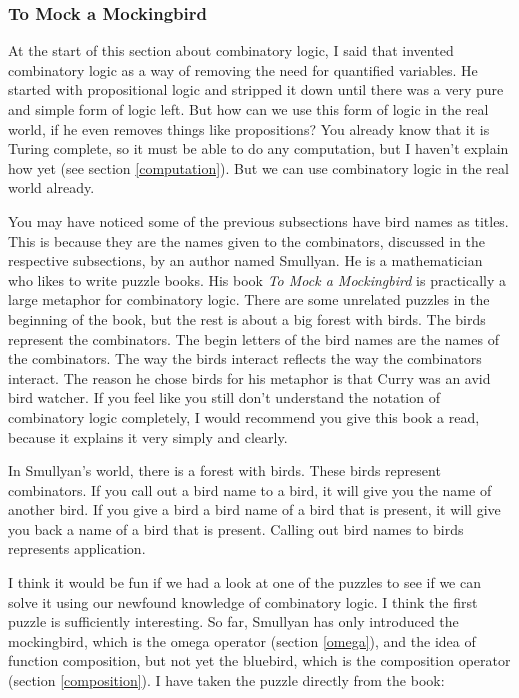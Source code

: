 \documentclass[11pt]{article}
\begin{document}
\subsubsection{To Mock a Mockingbird}

At the start of this section about combinatory logic, I said that
\textcite{schonfinkel1924} invented combinatory logic as a way of removing the
need for quantified variables. He started with propositional logic and stripped
it down until there was a very pure and simple form of logic left. But how can
we use this form of logic in the real world, if he even removes things like
propositions? You already know that it is Turing complete, so it must be able
to do any computation, but I haven't explain how yet (see section
\ref{computation}). But we can use combinatory logic in the real world already.

You may have noticed some of the previous subsections have bird names as
titles. This is because they are the names given to the combinators, discussed
in the respective subsections, by an author named Smullyan. He is a
mathematician who likes to write puzzle books. His book \emph{To Mock a
Mockingbird} \parencite{smullyan2000} is practically a large metaphor for
combinatory logic. There are some unrelated puzzles in the beginning of the
book, but the rest is about a big forest with birds. The birds represent the
combinators. The begin letters of the bird names are the names of the
combinators. The way the birds interact reflects the way the combinators
interact. The reason he chose birds for his metaphor is that Curry was an avid
bird watcher. If you feel like you still don't understand the notation of
combinatory logic completely, I would recommend you give this book a read,
because it explains it very simply and clearly.

In Smullyan's world, there is a forest with birds. These birds represent
combinators. If you call out a bird name to a bird, it will give you the name
of another bird. If you give a bird a bird name of a bird that is present, it
will give you back a name of a bird that is present. Calling out bird names to
birds represents application.

I think it would be fun if we had a look at one of the puzzles to see if we can
solve it using our newfound knowledge of combinatory logic. I think the first
puzzle is sufficiently interesting. So far, Smullyan has only introduced the
mockingbird, which is the omega operator (section \ref{omega}), and the idea of
function composition, but not yet the bluebird, which is the composition
operator (section \ref{composition}). I have taken the puzzle directly from the
book:
\end{document}
